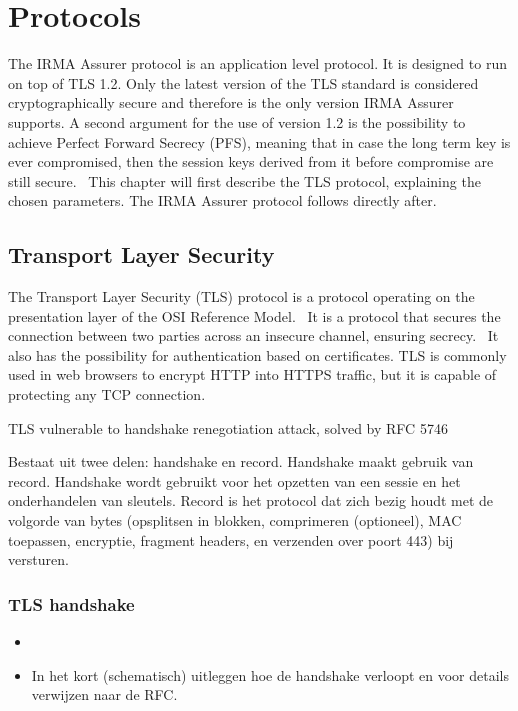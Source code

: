 \section{Protocols}
The IRMA Assurer protocol is an application level protocol. It is designed to run on top of TLS 1.2. Only the latest version of the TLS standard is considered cryptographically secure and therefore is the only version IRMA Assurer supports. A second argument for the use of version 1.2 is the possibility to achieve Perfect Forward Secrecy (PFS), meaning that in case the long term key is ever compromised, then the session keys derived from it before compromise are still secure.~\cite{PFS} This chapter will first describe the TLS protocol, explaining the chosen parameters. The IRMA Assurer protocol follows directly after.

\subsection{Transport Layer Security}
The Transport Layer Security (TLS) protocol is a protocol operating on the presentation layer of the OSI Reference Model.~\cite{osi} It is a protocol that secures the connection between two parties across an insecure channel, ensuring secrecy.~\cite{tls1.2} It also has the possibility for authentication based on certificates. TLS is commonly used in web browsers to encrypt HTTP into HTTPS traffic, but it is capable of protecting any TCP connection.~\cite{lecture}



TLS vulnerable to handshake renegotiation attack, solved by RFC 5746~\cite{lecture}

Bestaat uit twee delen: handshake en record. Handshake maakt gebruik van record. Handshake wordt gebruikt voor het opzetten van een sessie en het onderhandelen van sleutels. Record is het protocol dat zich bezig houdt met de volgorde van bytes (opsplitsen in blokken, comprimeren (optioneel), MAC toepassen, encryptie, fragment headers, en verzenden over poort 443) bij versturen.~\cite{lecture}

\subsubsection{TLS handshake}
\begin{itemize}
  \item 
  \item In het kort (schematisch) uitleggen hoe de handshake verloopt en voor details verwijzen naar de RFC.
\end{itemize}

